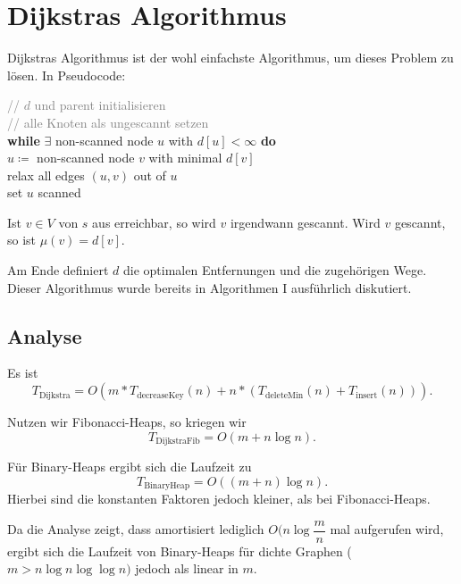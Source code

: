 \section{Dijkstras Algorithmus}

Dijkstras Algorithmus ist der wohl einfachste Algorithmus, um dieses Problem zu lösen. In Pseudocode:

\begin{pseudocode}
  \textcolor{gray}{// \( d \) und parent initialisieren} \\
  \textcolor{gray}{// alle Knoten als ungescannt setzen} \\
  \textbf{while} \( \exists \) non-scanned node \( u \) with \( d[u] < \infty \) \textbf{do} \\
  \phantom{\enskip} \( u \coloneqq \) non-scanned node \( v \) with minimal \( d[v] \) \\
  \phantom{\enskip} relax all edges \( (u,v) \) out of \( u \) \\
  \phantom{\enskip} set \( u \) scanned
\end{pseudocode}

Ist \( v \in V \) von \( s \) aus erreichbar, so wird \( v \) irgendwann gescannt. Wird \( v \) gescannt, so ist \( \mu(v) = d[v] \).

Am Ende definiert \( d \) die optimalen Entfernungen und  die zugehörigen Wege. Dieser Algorithmus wurde bereits in Algorithmen I ausführlich diskutiert.

\subsection{Analyse}

Es ist
\begin{equation*}
  T_{\text{Dijkstra}} = O(m*T_\text{decreaseKey}(n) + n*(T_\text{deleteMin}(n) + T_\text{insert}(n)))\text{.}
\end{equation*}


Nutzen wir Fibonacci-Heaps, so kriegen wir
\begin{equation*}
  T_\text{DijkstraFib} = O(m+n\log n)\text{.}
\end{equation*}

Für Binary-Heaps ergibt sich die Laufzeit zu
\begin{equation*}
  T_\text{BinaryHeap} = O((m+n)\log n)\text{.}
\end{equation*}
Hierbei sind die konstanten Faktoren jedoch kleiner, als bei Fibonacci-Heaps.

Da die Analyse zeigt, dass  amortisiert lediglich $O(n \log \dfrac{m}{n}$ mal aufgerufen wird, ergibt sich die Laufzeit von Binary-Heaps für dichte Graphen ($m > n \log n \log \log n)$ jedoch als linear in $m$.

